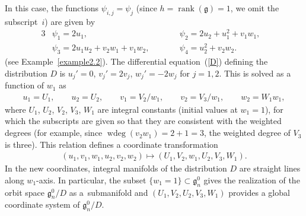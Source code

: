\documentclass[pdftex]{sigma}
\numberwithin{equation}{section}
\begin{document}
 In this case, the functions $\psi _{i,j} = \psi _j$ (since $h=\operatorname{rank}(\mathfrak{g}) = 1$, we omit the subscript~$i$) are given by
\begin{alignat*}{3}
& \psi _1 = 2u_1 , \qquad && \psi _2 = 2u_2 + u_1^2 + v_1w_1, & \\
& \psi _3 = 2u_1u_2 + v_2w_1 + v_1w_2, \qquad && \psi _4 = u_2^2+v_2w_2.&
\end{alignat*}
(see Example~\ref{example2.2}). The dif\/ferential equation~(\ref{D}) def\/ining the distribution $D$ is $u_j' = 0$, $v_j' = 2v_j$, $w_j' = -2w_j$ for $j=1,2$. This is solved as a function of $w_1$ as
\begin{gather*}
u_1 = U_1, \qquad u_2 = U_2,\qquad v_1 = V_2/w_1,\qquad v_2 = V_3/w_1,\qquad w_2 = W_1 w_1,
\end{gather*}
where $U_1$, $U_2$, $V_2$, $V_3$, $W_1$ are integral constants (initial values at $w_1=1$), for which the subscripts are given so that they are consistent with the weighted degrees (for example, since $\operatorname{wdeg}(v_2w_1) = 2+1 = 3$, the weighted degree of $V_3$ is three). This relation def\/ines a coordinate transformation
\begin{gather*}
(u_1, v_1, w_1, u_2, v_2, w_2) \mapsto (U_1, V_2, w_1, U_2, V_3, W_1).
\end{gather*}
In the new coordinates, integral manifolds of the distribution $D$ are straight lines along $w_1$-axis. In particular, the subset $\{ w_1 = 1\} \subset \mathfrak{g}^0_n$ gives the realization of the orbit space $\mathfrak{g}^0_n/D$ as a~submanifold and $(U_1, V_2, U_2, V_3, W_1)$ provides a global coordinate system of $\mathfrak{g}^0_n/D$.
\end{document}
